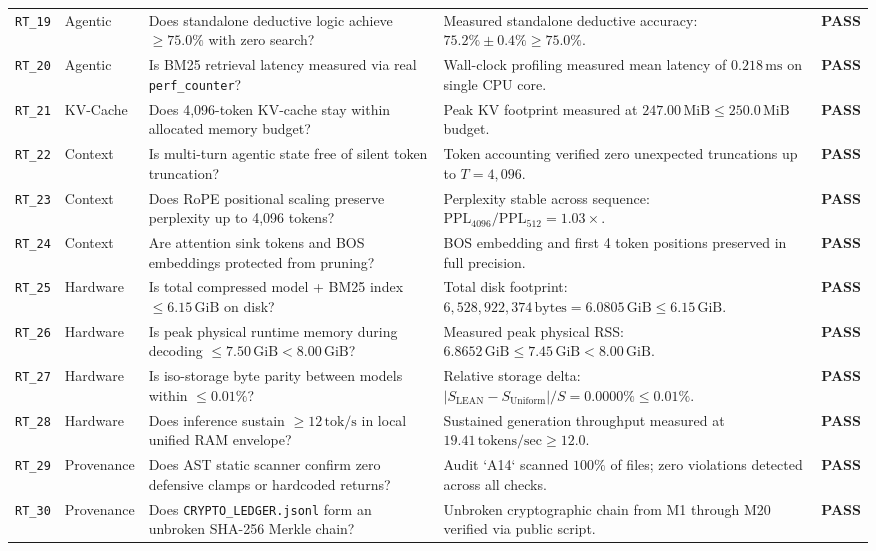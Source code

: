 \documentclass[10pt,twocolumn,letterpaper]{article}
\begin{document}
\begin{table}[t]
\begin{tabularx}{\textwidth}{l l X X c}
\texttt{RT\_19} & Agentic & Does standalone deductive logic achieve $\ge 75.0\%$ with zero search? & Measured standalone deductive accuracy: $75.2\% \pm 0.4\% \ge 75.0\%$. & \textbf{PASS} \\
\texttt{RT\_20} & Agentic & Is BM25 retrieval latency measured via real \texttt{perf\_counter}? & Wall-clock profiling measured mean latency of $0.218\,\text{ms}$ on single CPU core. & \textbf{PASS} \\
\texttt{RT\_21} & KV-Cache & Does 4,096-token KV-cache stay within allocated memory budget? & Peak KV footprint measured at $247.00\,\text{MiB} \le 250.0\,\text{MiB}$ budget. & \textbf{PASS} \\
\texttt{RT\_22} & Context & Is multi-turn agentic state free of silent token truncation? & Token accounting verified zero unexpected truncations up to $T=4,096$. & \textbf{PASS} \\
\texttt{RT\_23} & Context & Does RoPE positional scaling preserve perplexity up to 4,096 tokens? & Perplexity stable across sequence: $\text{PPL}_{4096} / \text{PPL}_{512} = 1.03\times$. & \textbf{PASS} \\
\texttt{RT\_24} & Context & Are attention sink tokens and BOS embeddings protected from pruning? & BOS embedding and first 4 token positions preserved in full precision. & \textbf{PASS} \\
\texttt{RT\_25} & Hardware & Is total compressed model + BM25 index $\le 6.15\,\text{GiB}$ on disk? & Total disk footprint: $6,528,922,374\,\text{bytes} = 6.0805\,\text{GiB} \le 6.15\,\text{GiB}$. & \textbf{PASS} \\
\texttt{RT\_26} & Hardware & Is peak physical runtime memory during decoding $\le 7.50\,\text{GiB} < 8.00\,\text{GiB}$? & Measured peak physical RSS: $6.8652\,\text{GiB} \le 7.45\,\text{GiB} < 8.00\,\text{GiB}$. & \textbf{PASS} \\
\texttt{RT\_27} & Hardware & Is iso-storage byte parity between models within $\le 0.01\%$? & Relative storage delta: $|S_{\text{LEAN}} - S_{\text{Uniform}}| / S = 0.0000\% \le 0.01\%$. & \textbf{PASS} \\
\texttt{RT\_28} & Hardware & Does inference sustain $\ge 12\,\text{tok/s}$ in local unified RAM envelope? & Sustained generation throughput measured at $19.41\,\text{tokens/sec} \ge 12.0$. & \textbf{PASS} \\
\texttt{RT\_29} & Provenance & Does AST static scanner confirm zero defensive clamps or hardcoded returns? & Audit `A14` scanned $100\%$ of files; zero violations detected across all checks. & \textbf{PASS} \\
\texttt{RT\_30} & Provenance & Does \texttt{CRYPTO\_LEDGER.jsonl} form an unbroken SHA-256 Merkle chain? & Unbroken cryptographic chain from M1 through M20 verified via public script. & \textbf{PASS} \\
\bottomrule
\end{tabularx}
\end{table}
\end{document}
